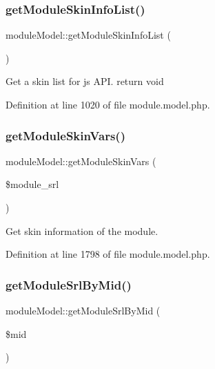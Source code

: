 \mbox{\label{classmoduleModel_a9fae8e7a41eda8e384cb46d25430ae82}} 
\subsubsection{\texorpdfstring{get\+Module\+Skin\+Info\+List()}{getModuleSkinInfoList()}}
{\footnotesize\ttfamily module\+Model\+::get\+Module\+Skin\+Info\+List (\begin{DoxyParamCaption}{ }\end{DoxyParamCaption})}

Get a skin list for js A\+PI. return void 

Definition at line 1020 of file module.\+model.\+php.

\mbox{\label{classmoduleModel_aa3828c94af2b1c8b84fafd423038445d}} 
\subsubsection{\texorpdfstring{get\+Module\+Skin\+Vars()}{getModuleSkinVars()}}
{\footnotesize\ttfamily module\+Model\+::get\+Module\+Skin\+Vars (\begin{DoxyParamCaption}\item[{}]{\$module\+\_\+srl }\end{DoxyParamCaption})}



Get skin information of the module. 



Definition at line 1798 of file module.\+model.\+php.

\mbox{\label{classmoduleModel_a857a241844d60b7678bd144175d23f29}} 
\subsubsection{\texorpdfstring{get\+Module\+Srl\+By\+Mid()}{getModuleSrlByMid()}}
{\footnotesize\ttfamily module\+Model\+::get\+Module\+Srl\+By\+Mid (\begin{DoxyParamCaption}\item[{}]{\$mid }\end{DoxyParamCaption})}



